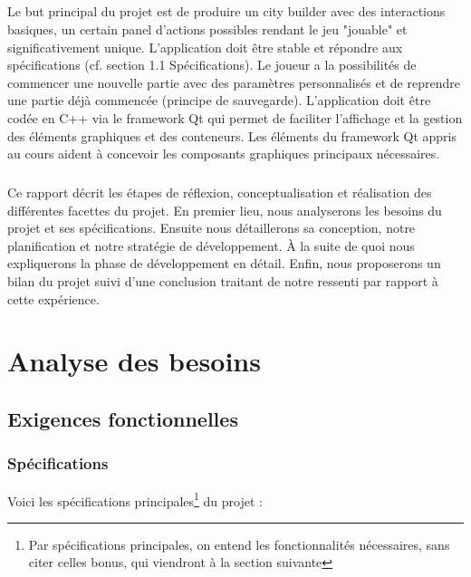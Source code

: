 \documentclass[a4paper,10pt,openany,oneside]{report}
\begin{document}
\thispagestyle{empty}
\paragraph{}
Le but principal du projet est de produire un city builder avec des interactions basiques, un certain panel d'actions possibles rendant le jeu "jouable" et significativement unique. L'application doit être stable et répondre aux spécifications (cf. section 1.1 Spécifications). Le joueur a la possibilités de commencer une nouvelle partie avec des paramètres personnalisés et de reprendre une partie déjà commencée (principe de sauvegarde). L'application doit être codée en C++ via le framework Qt qui permet de faciliter l'affichage et la gestion des éléments graphiques et des conteneurs. Les éléments du framework Qt appris au cours aident à concevoir les composants graphiques principaux nécessaires.
\paragraph{}
Ce rapport décrit les étapes de réflexion, conceptualisation et réalisation des différentes facettes du projet. En premier lieu, nous analyserons les besoins du projet et ses spécifications. Ensuite nous détaillerons sa conception, notre planification et notre stratégie de développement. À la suite de quoi nous expliquerons la phase de développement en détail. Enfin, nous proposerons un bilan du projet suivi d'une conclusion traitant de notre ressenti par rapport à cette expérience.

\chapter{Analyse des besoins}
\thispagestyle{headings}
\section{Exigences fonctionnelles}
\subsection{Spécifications}
Voici les spécifications principales\footnote{Par spécifications principales, on entend les fonctionnalités nécessaires, sans citer celles bonus, qui viendront à la section suivante} du projet :
\end{document}
